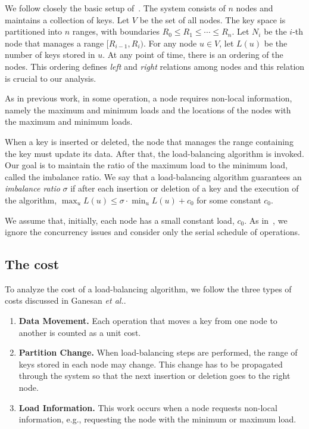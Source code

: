 \documentclass[a4paper]{article}
\begin{document}
We follow closely the basic setup of~\cite{GanesanBGM04-vldb}.  The
system consists of $n$ nodes and maintains a collection of keys. Let
$V$ be the set of all nodes. The key space is partitioned into $n$
ranges, with boundaries $R_0\leq R_1\leq\cdots\leq R_n$. Let $N_i$ be
the $i$-th node that manages a range $[R_{i-1},R_i)$. For any node $u\in
V$, let $L(u)$ be the number of keys stored in $u$. At any point of
time, there is an ordering of the nodes. This ordering defines {\em
  left} and {\em right} relations among nodes and this relation is
crucial to our analysis.

As in previous work, in some operation, a node requires non-local
information, namely the maximum and minimum loads and the
locations of the nodes with the maximum and minimum loads.

When a key is inserted or deleted, the node that manages the range
containing the key must update its data.  After that, the
load-balancing algorithm is invoked. Our goal is to maintain the ratio
of the maximum load to the minimum load, called the imbalance ratio.
We say that a load-balancing algorithm guarantees an \textit{imbalance
  ratio} $\sigma$ if after each insertion or deletion of a key and the
execution of the algorithm, $\max_u L(u)\leq \sigma\cdot\min_u
L(u)+c_0$ for some constant $c_0$.

We assume that, initially, each node has a small constant load, $c_0$.
As in~\cite{GanesanBGM04-vldb}, we ignore the concurrency issues and
consider only the serial schedule of operations.

\subsection{The cost}

To analyze the cost of a load-balancing algorithm, we follow the three
types of costs discussed in Ganesan {\em et al.}. 

\begin{enumerate}
\item {\bf Data Movement.} Each operation that moves a key from one
  node to another is counted as a unit cost.
\item {\bf Partition Change.}  When load-balancing steps are
  performed, the range of keys stored in each node may change.  This
  change has to be propagated through the system so that the next
  insertion or deletion goes to the right node.  
\item {\bf Load Information.} This work occurs when a node requests
  non-local information, e.g., requesting the node with the
  minimum or maximum load.
\end{enumerate}
\end{document}
